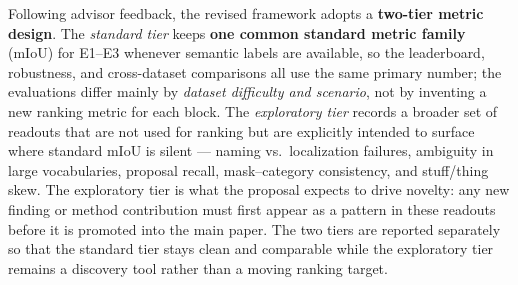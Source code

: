 \documentclass[11pt,a4paper]{article}
\begin{document}
Following advisor feedback, the revised framework adopts a \textbf{two-tier metric design}.
The \emph{standard tier} keeps \textbf{one common standard metric family} (mIoU) for E1--E3 whenever semantic labels are available, so the leaderboard, robustness, and cross-dataset comparisons all use the same primary number; the evaluations differ mainly by \emph{dataset difficulty and scenario}, not by inventing a new ranking metric for each block. The \emph{exploratory tier} records a broader set of readouts that are not used for ranking but are explicitly intended to surface where standard mIoU is silent --- naming vs.\ localization failures, ambiguity in large vocabularies, proposal recall, mask--category consistency, and stuff/thing skew. The exploratory tier is what the proposal expects to drive novelty: any new finding or method contribution must first appear as a pattern in these readouts before it is promoted into the main paper. The two tiers are reported separately so that the standard tier stays clean and comparable while the exploratory tier remains a discovery tool rather than a moving ranking target.
\end{document}

